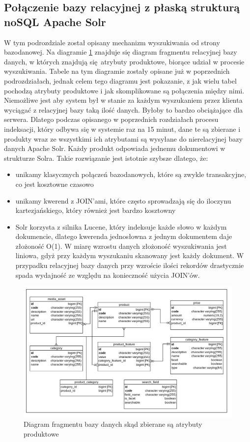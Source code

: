 \subsection{Połączenie bazy relacyjnej z płaską strukturą noSQL Apache Solr}
W tym podrozdziale został opisany mechanizm wyszukiwania od strony bazodanowej. Na diagramie \ref{db_wyszukiwarka} znajduje się diagram fragmentu relacyjnej bazy danych, w których znajdują się atrybuty produktowe, biorące udział w procesie wyszukiwania. Tabele na tym diagramie zostały opisane już w poprzednich podrozdziałach, jednak celem tego diagramu jest pokazanie, z jak wielu tabel pochodzą atrybuty produktowe i jak skomplikowane są połączenia między nimi. Niemożliwe jest aby system był w stanie za każdym wyszukaniem przez klienta wyciągać z relacyjnej bazy taką ilość danych. Byłoby to bardzo obciążające dla serwera. Dlatego podczas opisanego w poprzednich rozdziałach procesu indeksacji, który odbywa się w systemie raz na 15 minut, dane te są zbierane i produkty wraz ze wszystkimi ich atrybutami są wysyłane do nierelacyjnej bazy danych Apache Solr. Każdy produkt odpowiada jednemu dokumentowi w strukturze Solra. Takie rozwiązanie jest istotnie szybsze dlatego, że:
\begin{itemize}
	\item unikamy klasycznych połączeń bazodanowych, które są zwykle transakcyjne, co jest kosztowne czasowo
	\item unikamy kwerend z JOIN'ami, które często sprowadzają się do iloczynu kartezjańskiego, który również jest bardzo kosztowny
	\item Solr korzysta z silnika Lucene, który indeksuje każde słowo w każdym dokumencie, dlatego kwerenda jednosłowna z jednym dokumentem daje złożoność O(1). W miarę wzrostu danych złożoność wyszukiwania jest liniowa, gdyż przy każdym wyszukaniu skanowany jest każdy dokument. W przypadku relacyjnej bazy danych przy wzroście ilości rekordów drastycznie spada wydajność ze względu na konieczność użycia JOIN'ów.
\end{itemize}
 
\begin{figure}
	\begin{center}
		\includegraphics[scale=0.25]{db_wyszukiwarka.png}
	\end{center}
	\caption{{\color{black}Diagram fragmentu bazy danych skąd zbierane są atrybuty produktowe}} \label{db_wyszukiwarka}
\end{figure}


